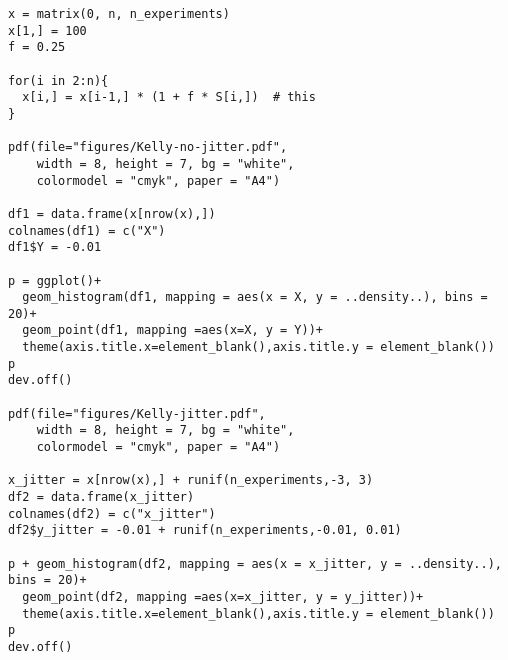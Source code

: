 \begin{exercise}
\begin{verbatim}
x = matrix(0, n, n_experiments)
x[1,] = 100
f = 0.25

for(i in 2:n){
  x[i,] = x[i-1,] * (1 + f * S[i,])  # this
}

pdf(file="figures/Kelly-no-jitter.pdf",
    width = 8, height = 7, bg = "white",
    colormodel = "cmyk", paper = "A4")

df1 = data.frame(x[nrow(x),])
colnames(df1) = c("X")
df1$Y = -0.01

p = ggplot()+
  geom_histogram(df1, mapping = aes(x = X, y = ..density..), bins = 20)+
  geom_point(df1, mapping =aes(x=X, y = Y))+
  theme(axis.title.x=element_blank(),axis.title.y = element_blank())
p
dev.off()

pdf(file="figures/Kelly-jitter.pdf",
    width = 8, height = 7, bg = "white",
    colormodel = "cmyk", paper = "A4")

x_jitter = x[nrow(x),] + runif(n_experiments,-3, 3)
df2 = data.frame(x_jitter)
colnames(df2) = c("x_jitter")
df2$y_jitter = -0.01 + runif(n_experiments,-0.01, 0.01)

p + geom_histogram(df2, mapping = aes(x = x_jitter, y = ..density..), bins = 20)+
  geom_point(df2, mapping =aes(x=x_jitter, y = y_jitter))+
  theme(axis.title.x=element_blank(),axis.title.y = element_blank())
p
dev.off()
\end{verbatim}


\end{exercise}



